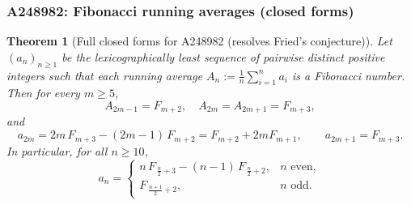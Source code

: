 \documentclass[12pt]{article}
\providecommand{\seqnum}[1]{#1}
\newtheorem{theorem}{Theorem}
\theoremstyle{remark}
\begin{document}
\subsubsection{A248982: Fibonacci running averages (closed forms)}
\begin{theorem}[Full closed forms for \seqnum{A248982} (resolves Fried's conjecture)]\label{thm:fib-full}
Let $(a_n)_{n\ge1}$ be the lexicographically least sequence of pairwise distinct positive integers such that each running average $A_n:=\tfrac{1}{n}\sum_{i=1}^n a_i$ is a Fibonacci number. Then for every $m\ge5$,
\[
 A_{2m-1}=F_{m+2},\quad A_{2m}=A_{2m+1}=F_{m+3},
\]
and
\[
 a_{2m}=2m\,F_{m+3}-(2m-1)\,F_{m+2}=F_{m+2}+2mF_{m+1},\qquad
 a_{2m+1}=F_{m+3}.
\]
In particular, for all $n\ge10$,
\[
 a_n=
 \begin{cases}
 n\,F_{\,\frac n2+3}-(n-1)\,F_{\,\frac n2+2}, & n\text{ even},\\[4pt]
 F_{\,\frac{n+1}{2}+2}, & n\text{ odd}.
 \end{cases}
\]
\end{theorem}
\end{document}
